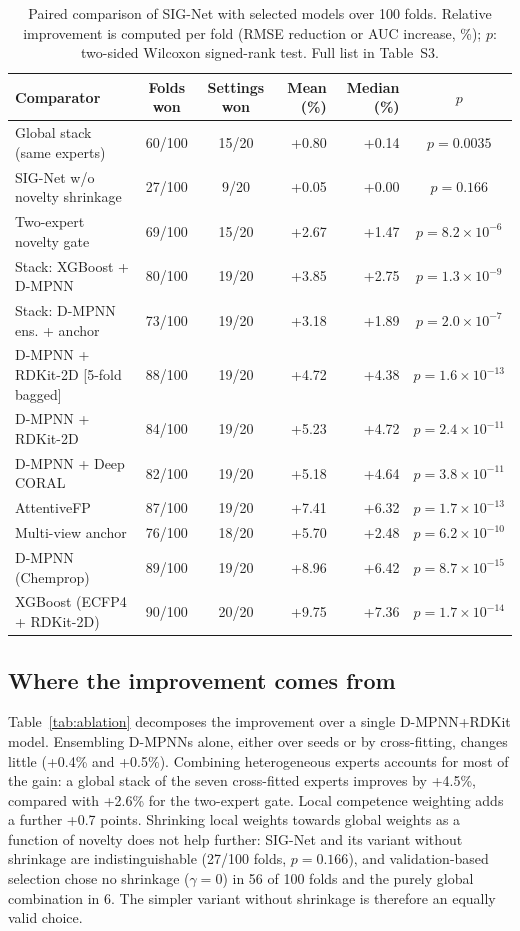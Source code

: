 \documentclass[journal=jcisd8,manuscript=article]{achemso}
\begin{document}
\begin{table}
\caption{Paired comparison of SIG-Net with selected models over 100 folds. Relative improvement is computed per fold (RMSE reduction or AUC increase, \%); $p$: two-sided Wilcoxon signed-rank test. Full list in Table~S3.}
\label{tab:h2h}
\scriptsize
\begin{tabular}{lccrrc}
\toprule
Comparator & Folds won & Settings won & Mean (\%) & Median (\%) & $p$ \\
\midrule
Global stack (same experts) & 60/100 & 15/20 & +0.80 & +0.14 & $p = 0.0035$ \\
SIG-Net w/o novelty shrinkage & 27/100 & 9/20 & +0.05 & +0.00 & $p = 0.166$ \\
Two-expert novelty gate & 69/100 & 15/20 & +2.67 & +1.47 & $p = 8.2 \times 10^{-6}$ \\
Stack: XGBoost + D-MPNN & 80/100 & 19/20 & +3.85 & +2.75 & $p = 1.3 \times 10^{-9}$ \\
Stack: D-MPNN ens. + anchor & 73/100 & 19/20 & +3.18 & +1.89 & $p = 2.0 \times 10^{-7}$ \\
D-MPNN + RDKit-2D [5-fold bagged] & 88/100 & 19/20 & +4.72 & +4.38 & $p = 1.6 \times 10^{-13}$ \\
D-MPNN + RDKit-2D & 84/100 & 19/20 & +5.23 & +4.72 & $p = 2.4 \times 10^{-11}$ \\
D-MPNN + Deep CORAL & 82/100 & 19/20 & +5.18 & +4.64 & $p = 3.8 \times 10^{-11}$ \\
AttentiveFP & 87/100 & 19/20 & +7.41 & +6.32 & $p = 1.7 \times 10^{-13}$ \\
Multi-view anchor & 76/100 & 18/20 & +5.70 & +2.48 & $p = 6.2 \times 10^{-10}$ \\
D-MPNN (Chemprop) & 89/100 & 19/20 & +8.96 & +6.42 & $p = 8.7 \times 10^{-15}$ \\
XGBoost (ECFP4 + RDKit-2D) & 90/100 & 20/20 & +9.75 & +7.36 & $p = 1.7 \times 10^{-14}$ \\
\bottomrule
\end{tabular}
\end{table}

\subsection{Where the improvement comes from}
Table~\ref{tab:ablation} decomposes the improvement over a single D-MPNN+RDKit model. Ensembling D-MPNNs alone, either over seeds or by cross-fitting, changes little (+0.4\% and +0.5\%). Combining heterogeneous experts accounts for most of the gain: a global stack of the seven cross-fitted experts improves by +4.5\%, compared with +2.6\% for the two-expert gate. Local competence weighting adds a further +0.7 points. Shrinking local weights towards global weights as a function of novelty does not help further: SIG-Net and its variant without shrinkage are indistinguishable (27/100 folds, $p = 0.166$), and validation-based selection chose no shrinkage ($\gamma = 0$) in 56 of 100 folds and the purely global combination in 6. The simpler variant without shrinkage is therefore an equally valid choice.
\end{document}
